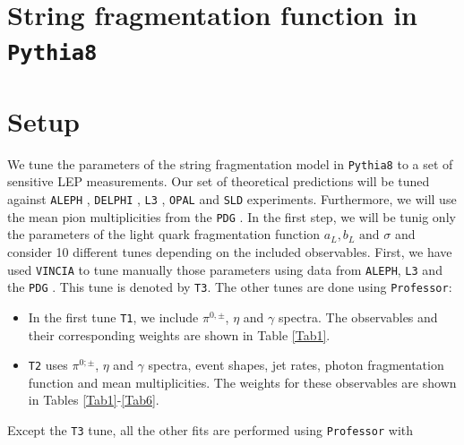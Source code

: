 \documentclass[aps,preprint,floatfix,nofootinbib,showpacs]{revtex4-1}
\begin{document}
\section{String fragmentation function in \texttt{Pythia8}} %
\label{Section2}

\section{Setup} %
\label{Section3}

We tune the parameters of the string fragmentation model 
in \texttt{Pythia8} to a set of sensitive LEP measurements. Our set
of theoretical predictions will be tuned against
\texttt{ALEPH} \cite{Decamp:1991uz, Buskulic:1994ft, Buskulic:1995au, Barate:1996fi, Heister:2001kp, Heister:2003aj},
\texttt{DELPHI} \cite{Abreu:1996na}, \texttt{L3} \cite{Adriani:1992hd, Achard:2004sv}, 
\texttt{OPAL} \cite{Akers:1994ez, Ackerstaff:1998ap, Ackerstaff:1998hz, Abbiendi:2004qz} and
\texttt{SLD} \cite{Abe:1998zs}
experiments. Furthermore, we will use the 
mean pion multiplicities from the \texttt{PDG} \cite{Amsler:2008zzb}.
In the first step, we will be tunig only the parameters of 
the light quark fragmentation function $a_L, b_L \text{ and } \sigma$ 
and consider 10 different tunes depending on the included observables. 
First, we have used \texttt{VINCIA} \cite{Giele:2007di} to tune manually those 
parameters using data from \texttt{ALEPH}, \texttt{L3}
and the \texttt{PDG} \cite{Achard:2004sv, Amsler:2008zzb}. This tune 
is denoted by \texttt{T3}. 
The other tunes are done using \texttt{Professor}:
\begin{itemize}
 \item In the first tune \texttt{T1}, we include $\pi^{0,\pm}$, $\eta$
 and $\gamma$ spectra. The observables and their corresponding weights are
 shown in Table \ref{Tab1}.
 \item \texttt{T2} uses $\pi^{0;\pm}$, $\eta$ and $\gamma$ spectra, event shapes, jet rates, photon fragmentation function and 
 mean multiplicities. The weights
 for these observables are shown in Tables \ref{Tab1}-\ref{Tab6}.
 \end{itemize}
Except the \texttt{T3} tune, all the other fits 
are performed using \texttt{Professor} \cite{Buckley:2009bj} with 
\end{document}
